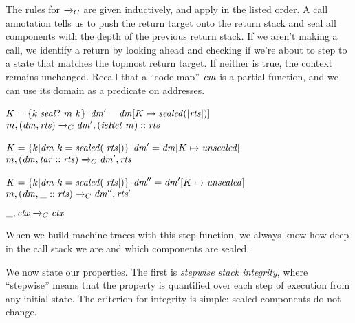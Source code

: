 \documentclass[acmsmall,review,anonymous]{acmart}\settopmatter{printfolios=true,printccs=false,printacmref=false}
\begin{document}
{The rules for \(\xrightarrow{}_C\) are given inductively, and apply in the listed order.
A call annotation tells us to push the return target onto the return stack and
seal all components with the depth of the previous return stack. If we aren't making a call,
we identify a return by looking ahead and checking if we're about to step to a state
that matches the topmost return target. If neither is true, the context remains unchanged.
Recall that a ``code map'' \(\mathit{cm}\) is a partial function, and we can use its domain
as a predicate on addresses.

\judgmentthree[ Call]
              {\(\codemap ~ (\mach ~ \PCname)\)}
              {\(K = \{k | \mathit{seal?} ~ m ~ k\}\)}
              {\(\mathit{dm}' = \mathit{dm}[K \mapsto \mathit{sealed(|\mathit{rts}|)}]\)}
                {\(m,(\mathit{dm},\mathit{rts}) \xrightarrow{}_C \mathit{dm}',(\mathit{isRet} ~ m)::\mathit{rts}\)}

\vspace*{-1ex}
              {\(K = \{k | \mathit{dm} ~ k = \mathit{sealed(|\mathit{rts}|)}\}\)}
              {\(\mathit{dm}' = \mathit{dm}[K \mapsto \mathit{unsealed}]\)}
              {\(m,(\mathit{dm},\mathit{tar}::\mathit{rts}) \xrightarrow{}_C \mathit{dm}',\mathit{rts}\)}

\vspace*{-1ex}
              {\(K = \{k | \mathit{dm} ~ k = \mathit{sealed(|\mathit{rts}|)}\}\)}
              {\(\mathit{dm}'' = \mathit{dm}'[K \mapsto \mathit{unsealed}]\)}
              {\(m,(\mathit{dm},\mbox{\_}::\mathit{rts}) \xrightarrow{}_C \mathit{dm}'',\mathit{rts}'\)}

\vspace*{-3.5ex}
\judgment[ Default]
         {}
         {\(\mbox{\_},\mathit{ctx} \xrightarrow{}_C \mathit{ctx}\)}

\noindent
When we build machine traces with this step function, we always know how deep in the
call stack we are and which components are sealed.

We now state our properties.
The first is {\em stepwise stack integrity}, where ``stepwise'' means that the property is
quantified over each step of execution from any initial state. The criterion for integrity
is simple: sealed components do not change.

}
\end{document}
